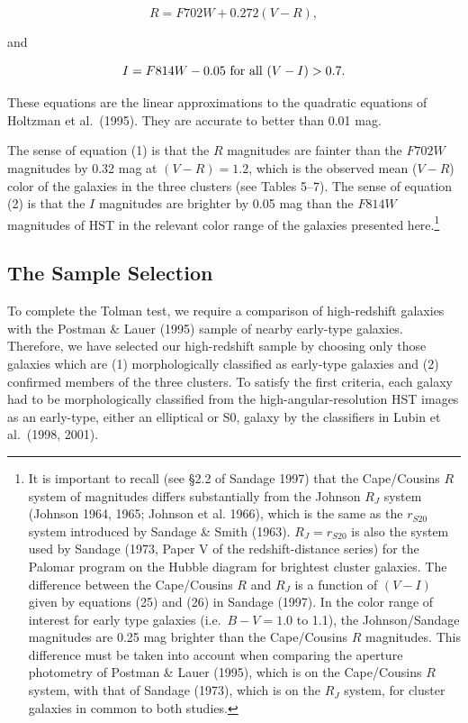 \documentclass[preprint]{aastex}
\begin{document}
\begin{equation}
           R = F702W + 0.272 (V-R),
\end{equation}

\noindent and 

\begin{equation}
     I = F814W - 0.05~{\rm for~all}~(V-I) > 0.7.
\end{equation}

\noindent These equations are the linear approximations to the
quadratic equations of Holtzman et al.\ (1995). They are accurate to
better than 0.01 mag.

The sense of equation (1) is that the $R$ magnitudes are fainter than
the $F702W$ magnitudes by 0.32 mag at $(V-R) = 1.2$, which is the
observed mean ($V-R$) color of the galaxies in the three clusters (see
Tables 5--7). The sense of equation (2) is that the $I$ magnitudes are
brighter by 0.05 mag than the $F814W$ magnitudes of HST in the
relevant color range of the galaxies presented here.\footnote{It is
important to recall (see \S 2.2 of Sandage 1997) that the Cape/Cousins
$R$ system of magnitudes differs substantially from the Johnson $R_J$
system (Johnson 1964, 1965; Johnson et al. 1966), which is the same as
the $r_{S20}$ system introduced by Sandage \& Smith (1963). $R_J =
r_{S20}$ is also the system used by Sandage (1973, Paper V of the
redshift-distance series) for the Palomar program on the Hubble
diagram for brightest cluster galaxies. The difference between the
Cape/Cousins $R$ and $R_J$ is a function of $(V-I)$ given by equations
(25) and (26) in Sandage (1997). In the color range of interest for
early type galaxies (i.e.\ $B-V = 1.0$ to 1.1), the Johnson/Sandage
magnitudes are 0.25 mag brighter than the Cape/Cousins $R$
magnitudes. This difference must be taken into account when comparing
the aperture photometry of Postman \& Lauer (1995), which is on the
Cape/Cousins $R$ system, with that of Sandage (1973), which is on the
$R_J$ system, for cluster galaxies in common to both studies.}

\subsection{The Sample Selection}

To complete the Tolman test, we require a comparison of high-redshift
galaxies with the Postman \& Lauer (1995) sample of nearby early-type
galaxies. Therefore, we have selected our high-redshift sample by
choosing only those galaxies which are (1) morphologically classified
as early-type galaxies and (2) confirmed members of the three
clusters. To satisfy the first criteria, each galaxy had to be
morphologically classified from the high-angular-resolution HST images
as an early-type, either an elliptical or S0, galaxy by the classifiers
in Lubin et al.\ (1998, 2001).
\end{document}
